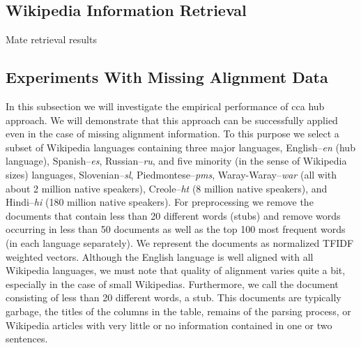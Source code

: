 \documentclass[twoside,11pt]{article}
\newcommand{\oldText}[1]{\textcolor{red}{#1:}\color{blue}}
\begin{document}
\subsection{Wikipedia Information Retrieval}

Mate retrieval results

\subsection{Experiments With Missing Alignment Data}
 In this subsection we will investigate the empirical performance of cca hub approach. We will demonstrate that this approach can be successfully applied even in the case of missing alignment information.
 To this purpose we select a subset of Wikipedia languages containing three major languages, English--\emph{en} (hub language), Spanish--\emph{es}, Russian--\emph{ru}, and five minority (in the sense of Wikipedia sizes) languages, Slovenian--\emph{sl}, Piedmontese--\emph{pms}, Waray-Waray--\emph{war} (all with about 2 million native speakers), Creole--\emph{ht} (8 million native speakers), and Hindi--\emph{hi} (180 million native speakers). For preprocessing we remove the documents that contain less than 20 different words (stubs) and remove words occurring in less than 50 documents as well as the top 100 most frequent words (in each language separately). We represent the documents as normalized TFIDF\cite{Salton88term-weightingapproaches} weighted vectors. 
 Although the English language is well aligned with all Wikipedia languages, we must note that quality of alignment varies quite a bit, especially in the case of small Wikipedias.
 Furthermore, we call the document consisting of less than 20 different words, a stub. This documents are typically garbage, the titles of the columns in the table, remains of the parsing process, or Wikipedia articles with very little or no information contained in one or two sentences.
\end{document}
